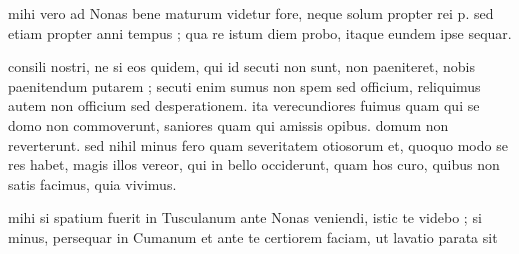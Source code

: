 


 mihi vero ad Nonas bene maturum videtur fore, neque solum propter rei p. sed etiam propter anni tempus ; qua re istum diem probo, itaque eundem ipse sequar.

 consili nostri, ne si eos quidem, qui id secuti non sunt, non paeniteret, nobis paenitendum putarem ; secuti enim sumus non spem sed officium, reliquimus autem non officium sed desperationem. ita verecundiores fuimus quam qui se domo non commoverunt, saniores quam qui amissis opibus. domum non reverterunt. sed nihil minus fero quam severitatem otiosorum et, quoquo modo se res habet, magis illos vereor, qui in bello occiderunt, quam hos curo, quibus non satis facimus, quia vivimus.

 mihi si spatium fuerit in Tusculanum ante Nonas veniendi, istic te videbo ; si minus, persequar in Cumanum et ante te certiorem faciam, ut lavatio parata sit

